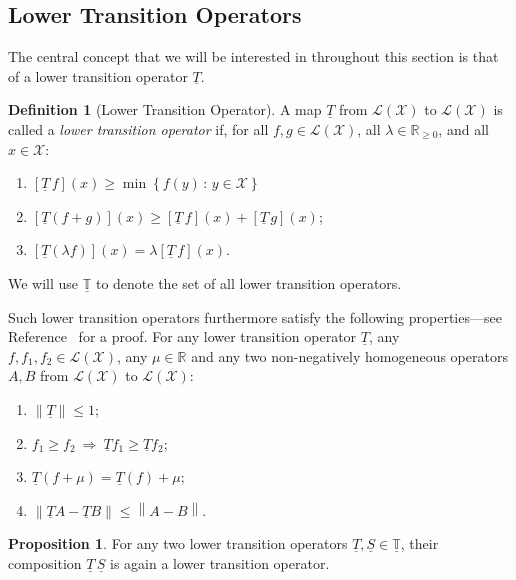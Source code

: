 \documentclass[10pt,a4paper]{paper}
\theoremstyle{definition}
\newtheorem{proposition}[theorem]{Proposition}
\newtheorem{definition}{Definition}
\newcommand{\reals}{\mathbb{R}}
\newcommand{\realsnonneg}{\reals_{\geq 0}}
\newcommand{\states}{\mathcal{X}}
\newcommand{\lt}{\underline{T}}
\newcommand{\gambles}{\mathcal{L}}
\newcommand{\gamblesX}{\gambles(\states)}
\newcommand{\then}{\Rightarrow}
\newcommand{\norm}[1]{\left\lVert #1 \right\rVert}
\begin{document}
\subsection{Lower Transition Operators}\label{subsec:lowertrans_rate}

The central concept that we will be interested in throughout this section is that of a lower transition operator $\lt$.

\begin{definition}[Lower Transition Operator]\label{def:coh_low_trans}
A map $\lt$ from $\gamblesX$ to $\gamblesX$ is called a \emph{lower transition operator} if, for all $f,g\in\gamblesX$, all $\lambda\in\realsnonneg$, and all $x\in\states$:
\begin{enumerate}[label=LT\arabic*:,ref=LT\arabic*]
\item
$\left[\lt\,f\right](x)\geq\min\left\{f(y)\,\colon\,y\in\states\right\}$ \label{LT:bounded_min}
\item
$\left[\lt(f+g)\right](x)\geq \left[\lt\,f\right](x)+\left[\lt\,g\right](x)$; \label{LT:super_additive}
\item
$\left[\lt(\lambda f)\right](x)=\lambda\left[\lt\,f\right](x)$. \label{LT:homo}
\end{enumerate}
\noindent We will use $\underline{\mathbb{T}}$ to denote the set of all lower transition operators.

Such lower transition operators furthermore satisfy the following properties---see Reference~\cite{DeBock:2016} for a proof. For any lower transition operator $\lt$, any $f,f_1,f_2\in\gamblesX$, any $\mu\in\reals$ and any two non-negatively homogeneous operators $A,B$ from $\gamblesX$ to $\gamblesX$:
\begin{enumerate}[label=LT\arabic*:,ref=LT\arabic*,start=4]
\item
$\norm{\lt} \leq 1$; \label{LT:norm_at_most_one}
\item
$f_1\geq f_2~\then~\lt f_1\geq\lt f_2$;\label{LT:monotonicity}
\item
$\lt(f+\mu)=\lt(f)+\mu$;\label{LT:constantadditivity}
\item
$\norm{\lt A - \lt B} \leq \norm{A - B}$. \label{LT:differencenorm}
\end{enumerate}
\vspace{0pt}
\end{definition}

\begin{proposition}\label{lemma:compositioncoherence}
For any two lower transition operators $\lt,\underline{S}\in\underline{\mathbb{T}}$, their composition $\lt\,\underline{S}$ is again a lower transition operator.%
\end{proposition}
\end{document}
